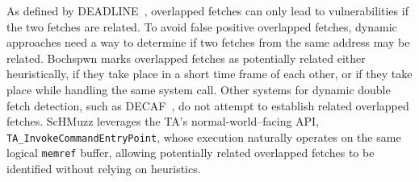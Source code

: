 \documentclass[conference]{IEEEtran}
\newcommand{\sysname}{ScHMuzz\xspace}
\begin{document}

As defined by DEADLINE~\cite{deadline}, overlapped fetches can only lead to vulnerabilities if 
the two fetches are related. To avoid false positive overlapped fetches, dynamic approaches need 
a way to determine if two fetches from the same address may be related.
Bochspwn marks overlapped fetches as potentially related either heuristically, if they take place in a short 
time frame of each other, or if they take place while handling the same system call. 
Other systems for dynamic double fetch detection, such as DECAF~\cite{decaf}, do not attempt to establish related overlapped fetches.
\sysname leverages the TA’s normal-world–facing API, \texttt{TA\_InvokeCommandEntryPoint}, 
whose execution naturally operates on the same logical \texttt{memref} buffer, allowing potentially 
related overlapped fetches to be identified without relying on heuristics.


\end{document}
